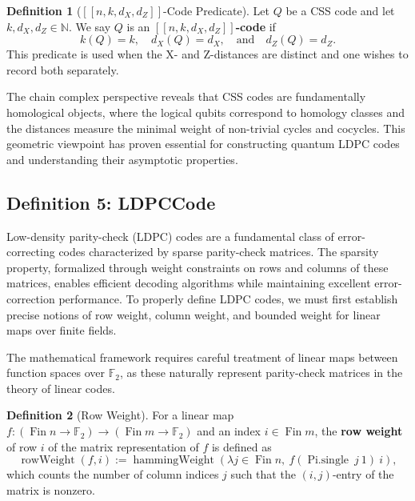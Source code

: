 \documentclass[11pt]{article}
\theoremstyle{plain}
\theoremstyle{definition}
\newtheorem*{definition}{Definition}
\theoremstyle{remark}
\begin{document}
\begin{definition}[{$[\![n,k,d_X,d_Z]\!]$-Code Predicate}]
Let $Q$ be a CSS code and let $k, d_X, d_Z \in \mathbb{N}$. We say $Q$ is an \textbf{$[\![n,k,d_X,d_Z]\!]$-code} if
\[
  k(Q) = k, \quad d_X(Q) = d_X, \quad \text{and} \quad d_Z(Q) = d_Z.
\]
This predicate is used when the X- and Z-distances are distinct and one wishes to record both separately.
\end{definition}

The chain complex perspective reveals that CSS codes are fundamentally homological objects, where the logical qubits correspond to homology classes and the distances measure the minimal weight of non-trivial cycles and cocycles. This geometric viewpoint has proven essential for constructing quantum LDPC codes and understanding their asymptotic properties.

\vspace{1em}

\subsection{Definition 5: LDPCCode}

Low-density parity-check (LDPC) codes are a fundamental class of error-correcting codes characterized by sparse parity-check matrices. The sparsity property, formalized through weight constraints on rows and columns of these matrices, enables efficient decoding algorithms while maintaining excellent error-correction performance. To properly define LDPC codes, we must first establish precise notions of row weight, column weight, and bounded weight for linear maps over finite fields.

The mathematical framework requires careful treatment of linear maps between function spaces over $\mathbb{F}_2$, as these naturally represent parity-check matrices in the theory of linear codes.

\begin{definition}[Row Weight]
For a linear map $f : (\operatorname{Fin} n \to \mathbb{F}_2) \to (\operatorname{Fin} m \to \mathbb{F}_2)$ and an index $i \in \operatorname{Fin} m$, the \textbf{row weight} of row $i$ of the matrix representation of $f$ is defined as
\[
\operatorname{rowWeight}(f, i) := \operatorname{hammingWeight}\!\left(\lambda j \in \operatorname{Fin} n,\ f(\operatorname{Pi.single}\ j\ 1)\ i\right),
\]
which counts the number of column indices $j$ such that the $(i,j)$-entry of the matrix is nonzero.
\end{definition}
\end{document}
